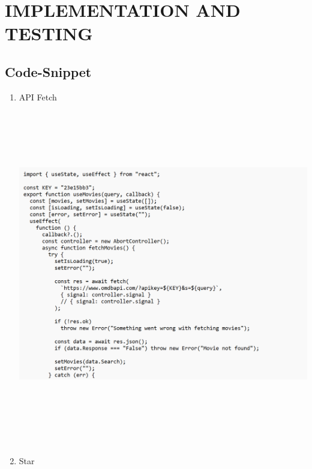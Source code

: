 \chapter{IMPLEMENTATION AND TESTING}
\section{Code-Snippet}
\begin{enumerate}
\item API Fetch\\
\vspace{2cm}
\includegraphics[height=15cm,width=17.5cm]{project/images/API.png}\\
\newpage
\item Star\\

\end{enumerate}

